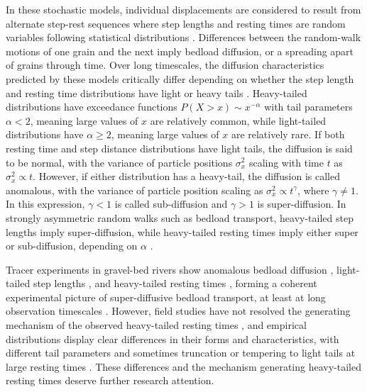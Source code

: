 \documentclass[draft]{agujournal2018}
\begin{document}
In these stochastic models, individual displacements are considered to result from alternate step-rest sequences where step lengths and resting times are random variables following statistical distributions \citep{Einstein1937, Yano1969, Nakagawa1976, Hassan1991, Bradley2012}.
Differences between the random-walk motions of one grain and the next imply bedload diffusion, or a spreading apart of grains through time.
Over long timescales, the diffusion characteristics predicted by these models critically differ depending on whether the step length and resting time distributions have light or heavy tails \citep[e.g.][]{Weeks1998}.
Heavy-tailed distributions have exceedance functions $P(X>x) \sim x^{-\alpha}$ with tail parameters $\alpha < 2$, meaning large values of $x$ are relatively common, while light-tailed distributions have $\alpha \geq 2$, meaning large values of $x$ are relatively rare.
If both resting time and step distance distributions have light tails, the diffusion is said to be normal, with the variance of particle positions $\sigma_x^2$
scaling with time $t$ as $\sigma_x^2 \propto t$.
However, if either distribution has a heavy-tail, the diffusion is called anomalous, with the variance of particle position scaling as $\sigma_x^2 \propto t^\gamma$, where $\gamma\neq 1$.
In this expression, $\gamma <1$ is called sub-diffusion and $\gamma > 1$ is super-diffusion.
In strongly asymmetric random walks such as bedload transport, heavy-tailed step lengths imply super-diffusion, while heavy-tailed resting times imply either super or sub-diffusion, depending on $\alpha$ \citep{Weeks1996, Weeks1998,Bradley2017}.

Tracer experiments in gravel-bed rivers show anomalous bedload diffusion \citep{Phillips2013, Bradley2017}, light-tailed step lengths \citep{Bradley2012, Hassan2013,Phillips2013}, and heavy-tailed resting times \citep{Voepel2013, Olinde2015, Pretzlav2016, Bradley2017}, forming a coherent experimental picture of super-diffusive bedload transport, at least at long observation timescales \citep[e.g.][]{Nikora2002, Martin2012}.
However, field studies have not resolved the generating mechanism of the observed heavy-tailed resting times \citep[e.g.][]{Bradley2017}, and empirical distributions display clear differences in their forms and characteristics, with different tail parameters \citep[e.g.][]{Olinde2015,Pretzlav2016} and sometimes truncation \citep[e.g.][]{Bradley2017} or tempering to light tails at large resting times \citep[e.g.][]{Voepel2013}.
These differences and the mechanism generating heavy-tailed resting times deserve further research attention.
\end{document}

